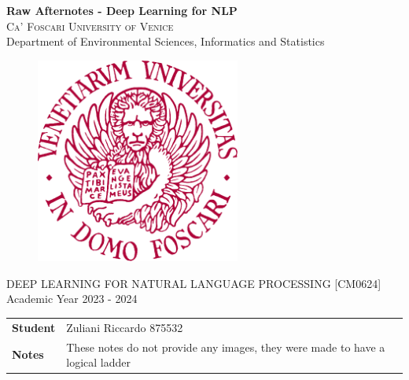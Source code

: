 \begin{titlepage}
    \vspace*{1 cm}
    \begin{center}
         {\LARGE \textbf{Raw Afternotes - Deep Learning for NLP}\\}
        \vspace{2 cm}
        \textsc{Ca' Foscari University of Venice}\\
        Department of Environmental Sciences, Informatics and Statistics\\
        \vspace{0.2 cm}
        \begin{figure}[h!]
        	\centering
        	\includegraphics[width=0.6\textwidth]{logo} 
        \end{figure}
        \vspace{0.0 cm} DEEP LEARNING FOR NATURAL LANGUAGE PROCESSING [CM0624]\\
        Academic Year 2023 - 2024\\
        \vspace{3.0 cm}
        	
        \begin{flushleft}
        	\begin{tabular}{l l}
        		\textbf{Student} & Zuliani Riccardo 875532\\
                \textbf{Notes} & These notes do not provide any images, they were made to have a logical ladder
        	\end{tabular}
        \end{flushleft}
    \end{center}
\end{titlepage}
